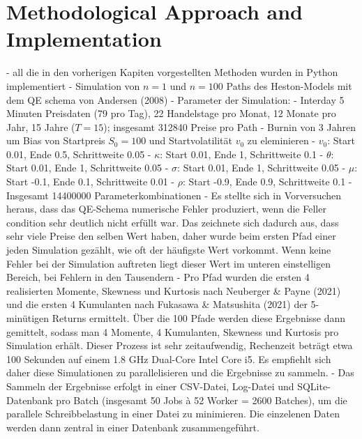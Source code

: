 \section{Methodological Approach and Implementation}

- all die in den vorherigen Kapiten vorgestellten Methoden wurden in Python implementiert
- Simulation von $n=1$ und $n=100$ Paths des Heston-Models mit dem QE schema von Andersen (2008) %
- Parameter der Simulation:
    - Interday 5 Minuten Preisdaten (79 pro Tag), 22 Handelstage pro Monat, 12 Monate pro Jahr, 15 Jahre ($T = 15$); insgesamt 312840 Preise pro Path
    - Burnin von 3 Jahren um Bias von Startpreis $S_0 = 100$ und Startvolatilität $v_0$ zu eleminieren
    - $v_0$: Start 0.01, Ende 0.5, Schrittweite 0.05
    - $\kappa$: Start 0.01, Ende 1, Schrittweite 0.1
    - $\theta$: Start 0.01, Ende 1, Schrittweite 0.05
    - $\sigma$: Start 0.01, Ende 1, Schrittweite 0.05
    - $\mu$: Start -0.1, Ende 0.1, Schrittweite 0.01
    - $\rho$: Start -0.9, Ende 0.9, Schrittweite 0.1
    - Insgesamt 14400000 Parameterkombinationen %
- Es stellte sich in Vorversuchen heraus, dass das QE-Schema numerische Fehler produziert, wenn die Feller condition sehr deutlich nicht erfüllt war. Das zeichnete sich dadurch aus, dass sehr viele Preise den selben Wert haben, daher wurde beim ersten Pfad einer jeden Simulation gezählt, wie oft der häufigste Wert vorkommt. Wenn keine Fehler bei der Simulation auftreten liegt dieser Wert im unteren einstelligen Bereich, bei Fehlern in den Tausendern %
- Pro Pfad wurden die ersten 4 realisierten Momente, Skewness und Kurtosis nach Neuberger & Payne (2021) und die ersten 4 Kumulanten nach Fukasawa & Matsushita (2021) der 5-minütigen Returns ermittelt. Über die 100 Pfade werden diese Ergebnisse dann gemittelt, sodass man 4 Momente, 4 Kumulanten, Skewness und Kurtosis pro Simulation erhält. Dieser Prozess ist sehr zeitaufwendig, Rechenzeit beträgt etwa 100 Sekunden auf einem 1.8 GHz Dual-Core Intel Core i5. Es empfiehlt sich daher diese Simulationen zu parallelisieren und die Ergebnisse zu sammeln.
- Das Sammeln der Ergebnisse erfolgt in einer CSV-Datei, Log-Datei und SQLite-Datenbank pro Batch (insgesamt 50 Jobs à 52 Worker = 2600 Batches), um die parallele Schreibbelastung in einer Datei zu minimieren. Die einzelenen Daten werden dann zentral in einer Datenbank zusammengeführt.
